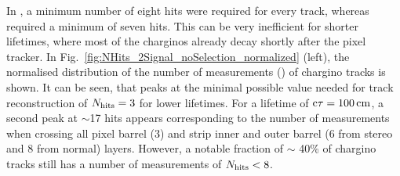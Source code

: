 In \cite{bib:CMS:HSCP_8TeV}, a minimum number of eight hits were required for every track, whereas \cite{bib:CMS:DT_8TeV} required a minimum of seven hits.
This can be very inefficient for shorter lifetimes, where most of the charginos already decay shortly after the pixel tracker.
In Fig.~\ref{fig:NHits_2Signal_noSelection_normalized} (left), the normalised distribution of the number of measurements (\nhits) of chargino tracks is shown. 
It can be seen, that \nhits peaks at the minimal possible value needed for track reconstruction of $N_{\text{hits}}=3$ for lower lifetimes.
For a lifetime of $\text{c}\tau=100\,\text{cm}$, a second peak at $\sim$17 hits appears corresponding to the number of measurements when crossing all pixel barrel (3) and strip inner and outer barrel (6 from stereo and 8 from normal) layers.
However, a notable fraction of $\sim$ 40\% of chargino tracks still has a number of measurements of $N_{\text{hits}}<8$. 


